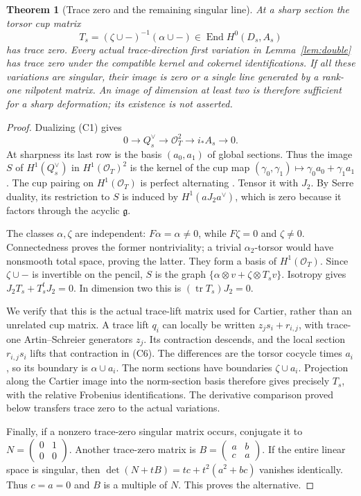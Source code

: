 \documentclass[11pt]{article}
\newtheorem{theorem}{Theorem}[section]
\theoremstyle{definition}\newtheorem{definition}[theorem]{Definition}
\theoremstyle{remark}\newtheorem{remark}[theorem]{Remark}
\newcommand{\OO}{\mathcal O}
\begin{document}
\begin{theorem}[Trace zero and the remaining singular line]\label{thm:tracezero}
At a sharp section the torsor cup matrix
\[
 T_s=(\zeta\cup-)^{-1}(\alpha\cup-)
       \in\operatorname{End}H^0(D_s,A_s)
\]
has trace zero. Every actual trace-direction first variation in Lemma~\ref{lem:double} has trace zero under the compatible kernel and cokernel identifications. If all these variations are singular, their image is zero or a single line generated by a rank-one nilpotent matrix. An image of dimension at least two is therefore sufficient for a sharp deformation; its existence is not asserted.
\end{theorem}
\begin{proof}
Dualizing (C1) gives
\[
 0\to Q_s^\vee\to\OO_T^2\to i_*A_s\to0.
\]
At sharpness its last row is the basis $(a_0,a_1)$ of global sections. Thus the image $S$ of $H^1(Q_s^\vee)$ in $H^1(\OO_T)^2$ is the kernel of the cup map
$(\gamma_0,\gamma_1)\mapsto\gamma_0a_0+\gamma_1a_1$.
The cup pairing on $H^1(\OO_T)$ is perfect alternating \citep[Proposition~7.27 and proof, p.~108; Corollary~6.13, pp.~93--94]{EGM}. Tensor it with $J_2$. By Serre duality, its restriction to $S$ is induced by $H^1(aJ_2a^\vee)$, which is zero because it factors through the acyclic $\mathfrak g$.

The classes $\alpha,\zeta$ are independent: $F\alpha=\alpha\ne0$, while $F\zeta=0$ and $\zeta\ne0$. Connectedness proves the former nontriviality; a trivial $\alpha _2$-torsor would have nonsmooth total space, proving the latter. They form a basis of $H^1(\OO_T)$. Since $\zeta\cup-$ is invertible on the pencil, $S$ is the graph
$\{\alpha\otimes v+\zeta\otimes T_sv\}$. Isotropy gives
$J_2T_s+T_s^tJ_2=0$. In dimension two this is
$(\operatorname{tr}T_s)J_2=0$.

We verify that this is the actual trace-lift matrix used for Cartier, rather than an unrelated cup matrix. A trace lift $q_i$ can locally be written $z_js_i+r_{i,j}$, with trace-one Artin--Schreier generators $z_j$. Its contraction descends, and the local section $r_{i,j}s_i$ lifts that contraction in (C6). The differences are the torsor cocycle times $a_i$, so its boundary is $\alpha\cup a_i$. The norm sections have boundaries $\zeta\cup a_i$. Projection along the Cartier image into the norm-section basis therefore gives precisely $T_s$, with the relative Frobenius identifications. The derivative comparison proved below transfers trace zero to the actual variations.

Finally, if a nonzero trace-zero singular matrix occurs, conjugate it to $N=\left(\begin{smallmatrix}0&1\\0&0\end{smallmatrix}\right)$. Another trace-zero matrix is $B=\left(\begin{smallmatrix}a&b\\c&a\end{smallmatrix}\right)$. If the entire linear space is singular, then
$\det(N+tB)=tc+t^2(a^2+bc)$ vanishes identically. Thus $c=a=0$ and $B$ is a multiple of $N$. This proves the alternative.
\end{proof}
\end{document}
